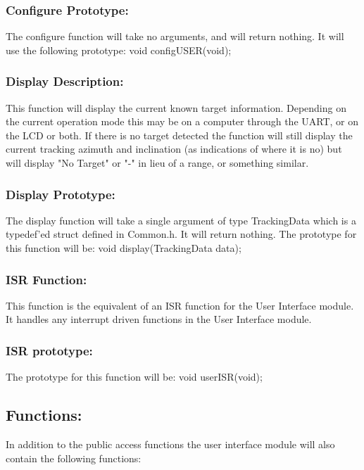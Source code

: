 \documentclass[]{article}
\begin{document}
\subsubsection{Configure Prototype:}
The configure function will take no arguments, and will return nothing. It will use the following prototype: \newline \newline
void configUSER(void);

\subsubsection{Display Description:}
This function will display the current known target information. Depending on the current operation mode this may be on a computer through the UART, or on the LCD or both. If there is no target detected the function will still display the current tracking azimuth and inclination (as indications of where it is no) but will display "No Target" or "-" in lieu of a range, or something similar.

\subsubsection{Display Prototype:}
The display function will take a single argument of type TrackingData which is a typedef'ed struct defined in Common.h. It will return nothing. The prototype for this function will be:
\newline \newline
void display(TrackingData data);

\subsubsection{ISR Function:}
This function is the equivalent of an ISR function for the User Interface module. It handles any interrupt driven functions in the User Interface module.

\subsubsection{ISR prototype:}
The prototype for this function will be: \newline \newline
void userISR(void);

\subsection{Functions:}
In addition to the public access functions the user interface module will also contain the following functions:
\end{document}
